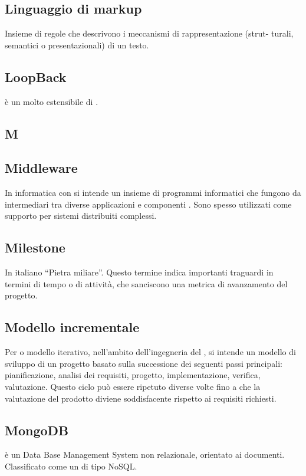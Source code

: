 \subsection*{Linguaggio di markup}
Insieme di regole che descrivono i meccanismi di rappresentazione (strut-
turali, semantici o presentazionali) di un testo.

\subsection*{LoopBack}
 è un   molto estensibile di . 

\newpage

\begin{center}
\Huge\section*{\uppercase{M}}
\end{center}

\subsection*{Middleware}
In informatica con  si intende un insieme di programmi informatici che fungono da intermediari tra diverse applicazioni e componenti . Sono spesso utilizzati come supporto per sistemi distribuiti complessi.

\subsection*{Milestone}
In italiano “Pietra miliare”. Questo termine indica importanti traguardi in termini di
tempo o di attività, che sanciscono una metrica di avanzamento del progetto.

\subsection*{Modello incrementale}
Per  o modello iterativo, nell'ambito dell'ingegneria
del , si intende un modello di sviluppo di un progetto  basato sulla successione
dei seguenti passi principali: pianificazione, analisi dei requisiti, progetto, implementazione,
verifica, valutazione. Questo ciclo può essere ripetuto diverse volte fino a che la valutazione
del prodotto diviene soddisfacente rispetto ai requisiti richiesti.

\subsection*{MongoDB}
 è un Data Base Management System non relazionale, orientato ai documenti. Classificato come un  di tipo NoSQL.

